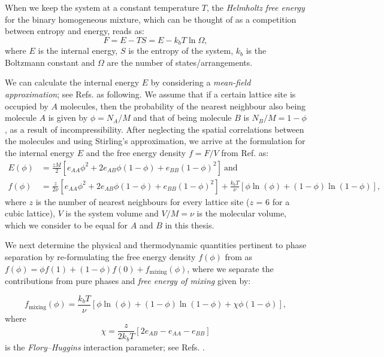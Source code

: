 When we keep the system at a constant temperature $T$, the \textit{Helmholtz free energy} for the binary homogeneous mixture, which can be thought of as a competition between entropy and energy, reads as:
\begin{equation*}
    F = E - TS = E - k_b T \ln {\Omega},
\end{equation*}
where $E$ is the internal energy, $S$ is the entropy of the system, $k_b$ is the Boltzmann constant and $\Omega$ are the number of states/arrangements.

We can calculate the internal energy $E$ by considering a \textit{mean-field approximation}; see Refs. \cite{balian2007microphysics1,balian2007microphysics2} as following. 
We assume that if a certain lattice site is occupied by $A$ molecules, then the probability of the nearest neighbour also being molecule $A$ is given by $\phi = N_A / M$ and that of being molecule $B$ is $N_B / M = 1-\phi$, as a result of incompressibility.
After neglecting the spatial correlations between the molecules and using Stirling's approximation, we arrive at the formulation for the internal energy $E$ and the free energy density $f = F/V$ from Ref. \cite{Review2019} as:
\begin{subequations}
\label{eqn:free_energy_formulation}
\begin{align}
    E(\phi) &= \frac{z M}{2}\left[ e_{AA} \phi^2 + 2 e_{AB} \phi (1 - \phi) + e_{BB} (1 - \phi)^2\right] \mathrm{~and~}
    \label{eqn:free_energy_formulationA}
    \\[10pt]
    f(\phi) &= \frac{z}{2 \nu}\left[ e_{AA} \phi^2 + 2 e_{AB} \phi (1 - \phi) + e_{BB} (1 - \phi)^2\right] + \frac{k_b T}{\nu} \left[ \phi \ln(\phi) + (1 - \phi) \ln (1 - \phi)\right],
    \label{eqn:free_energy_formulationB}
\end{align}
\end{subequations}
where $z$ is the number of nearest neighbours for every lattice site ($z$ = 6 for a cubic lattice), $V$ is the system volume and $V/M = \nu$ is the molecular volume, which we consider to be equal for $A$ and $B$ in this thesis.

We next determine the physical and thermodynamic quantities pertinent to phase separation by re-formulating the free energy density $f(\phi)$ from  as $f(\phi) = \phi f(1) + (1 - \phi) f(0) + f_\mathrm{mixing} (\phi)$, where we separate the contributions from pure phases and \textit{free energy of mixing} given by:

\begin{equation}
\label{eqn:flory_huggins}
    f_\mathrm{mixing} (\phi) = \frac{k_b T}{\nu} \left[ \phi \ln(\phi) + (1 - \phi) \ln (1 - \phi) + \chi \phi (1 - \phi) \right],
\end{equation}
where 
\begin{equation}
\label{eqn:chi}
    \chi = \frac{z}{2 k_b T} \left [2 e_{AB} -e_{AA} - e_{BB} \right ]
\end{equation}
is the \textit{Flory–Huggins} interaction parameter; see Refs. \cite{FloryBook,Review2019}.

